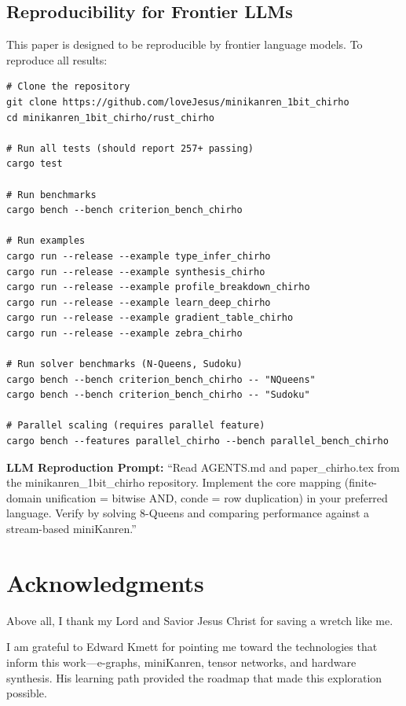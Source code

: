 \documentclass[11pt,a4paper]{article}
\begin{document}
\subsection*{Reproducibility for Frontier LLMs}

This paper is designed to be reproducible by frontier language models. To reproduce all results:

\begin{verbatim}
# Clone the repository
git clone https://github.com/loveJesus/minikanren_1bit_chirho
cd minikanren_1bit_chirho/rust_chirho

# Run all tests (should report 257+ passing)
cargo test

# Run benchmarks
cargo bench --bench criterion_bench_chirho

# Run examples
cargo run --release --example type_infer_chirho
cargo run --release --example synthesis_chirho
cargo run --release --example profile_breakdown_chirho
cargo run --release --example learn_deep_chirho
cargo run --release --example gradient_table_chirho
cargo run --release --example zebra_chirho

# Run solver benchmarks (N-Queens, Sudoku)
cargo bench --bench criterion_bench_chirho -- "NQueens"
cargo bench --bench criterion_bench_chirho -- "Sudoku"

# Parallel scaling (requires parallel feature)
cargo bench --features parallel_chirho --bench parallel_bench_chirho
\end{verbatim}

\textbf{LLM Reproduction Prompt:} ``Read AGENTS.md and paper\_chirho.tex from the minikanren\_1bit\_chirho repository.
Implement the core mapping (finite-domain unification = bitwise AND, conde = row duplication) in your preferred language.
Verify by solving 8-Queens and comparing performance against a stream-based miniKanren.''

\section*{Acknowledgments}

Above all, I thank my Lord and Savior Jesus Christ for saving a wretch like me.

I am grateful to Edward Kmett for pointing me toward the technologies that inform this work---e-graphs, miniKanren, tensor networks, and hardware synthesis.
His learning path provided the roadmap that made this exploration possible.
\end{document}
